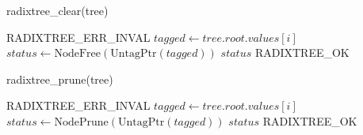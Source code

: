 \documentclass{article}
\begin{document}
\begin{algorithm}
  \caption{radixtree\_clear(tree)}
  \begin{algorithmic}[1]
    \State \Return RADIXTREE\_ERR\_INVAL
    \EndIf
    \State $tagged \gets tree.root.values[i]$
    \State $status \gets \mathrm{NodeFree}(\mathrm{UntagPtr}(tagged))$
    \State \Return $status$
    \EndIf
    \EndIf
    \EndFor
    \State \Return RADIXTREE\_OK
    \EndProcedure
  \end{algorithmic}
\end{algorithm}

\begin{algorithm}
  \caption{radixtree\_prune(tree)}
  \begin{algorithmic}[1]
    \State \Return RADIXTREE\_ERR\_INVAL
    \EndIf
    \State $tagged \gets tree.root.values[i]$
    \State $status \gets \mathrm{NodePrune}(\mathrm{UntagPtr}(tagged))$
    \State \Return $status$
    \EndIf
    \EndIf
    \EndFor
    \State \Return RADIXTREE\_OK
    \EndProcedure
  \end{algorithmic}
\end{algorithm}
\end{document}

